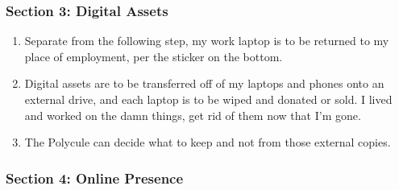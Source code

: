 \subsubsection*{Section 3: Digital Assets}\label{section-3-digital-assets}

\begin{enumerate}
\def\labelenumi{\arabic{enumi}.}
\tightlist
\item
  Separate from the following step, my work laptop is to be returned to my place of employment, per the sticker on the bottom.
\item
  Digital assets are to be transferred off of my laptops and phones onto an external drive, and each laptop is to be wiped and donated or sold. I lived and worked on the damn things, get rid of them now that I'm gone.
\item
  The Polycule can decide what to keep and not from those external copies.
\end{enumerate}

\subsubsection*{Section 4: Online Presence}\label{section-4-online-presence}

